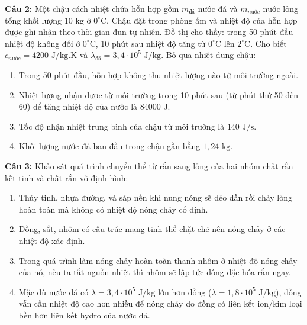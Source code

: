 \documentclass[12pt,a4paper]{article}
\begin{document}
\textbf{Câu 2:} Một chậu cách nhiệt chứa hỗn hợp gồm $m_{đá}$ nước đá và $m_{nước}$ nước lỏng tổng khối lượng $10\text{ kg}$ ở $0^{\circ}\text{C}$. Chậu đặt trong phòng ấm và nhiệt độ của hỗn hợp được ghi nhận theo thời gian đun tự nhiên. Đồ thị cho thấy: trong 50 phút đầu nhiệt độ không đổi ở $0^{\circ}\text{C}$, 10 phút sau nhiệt độ tăng từ $0^{\circ}\text{C}$ lên $2^{\circ}\text{C}$. Cho biết $c_{nước} = 4200\text{ J/kg.K}$ và $\lambda_{đá} = 3{,}4 \cdot 10^5\text{ J/kg}$. Bỏ qua nhiệt dung chậu:
\begin{enumerate}[label=\alph*)]
  \item Trong 50 phút đầu, hỗn hợp không thu nhiệt lượng nào từ môi trường ngoài.
  \item Nhiệt lượng nhận được từ môi trường trong 10 phút sau (từ phút thứ 50 đến 60) để tăng nhiệt độ của nước là $84000\text{ J}$.
  \item Tốc độ nhận nhiệt trung bình của chậu từ môi trường là $140\text{ J/s}$.
  \item Khối lượng nước đá ban đầu trong chậu gần bằng $1{,}24\text{ kg}$.
\end{enumerate}

\textbf{Câu 3:} Khảo sát quá trình chuyển thể từ rắn sang lỏng của hai nhóm chất rắn kết tinh và chất rắn vô định hình:
\begin{enumerate}[label=\alph*)]
  \item Thủy tinh, nhựa đường, và sáp nến khi nung nóng sẽ dẻo dần rồi chảy lỏng hoàn toàn mà không có nhiệt độ nóng chảy cố định.
  \item Đồng, sắt, nhôm có cấu trúc mạng tinh thể chặt chẽ nên nóng chảy ở các nhiệt độ xác định.
  \item Trong quá trình làm nóng chảy hoàn toàn thanh nhôm ở nhiệt độ nóng chảy của nó, nếu ta tắt nguồn nhiệt thì nhôm sẽ lập tức đông đặc hóa rắn ngay.
  \item Mặc dù nước đá có $\lambda = 3{,}4 \cdot 10^5\text{ J/kg}$ lớn hơn đồng ($\lambda = 1{,}8 \cdot 10^5\text{ J/kg}$), đồng vẫn cần nhiệt độ cao hơn nhiều để nóng chảy do đồng có liên kết ion/kim loại bền hơn liên kết hydro của nước đá.
\end{enumerate}
\end{document}
